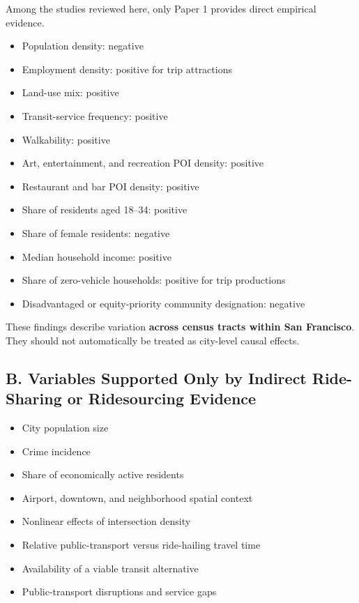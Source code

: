 \documentclass[10pt,a4paper]{article}
\providecommand{\tightlist}{\setlength{\itemsep}{0pt}\setlength{\parskip}{0pt}}
\begin{document}
Among the studies reviewed here, only Paper 1 provides direct empirical evidence.

\begin{itemize}
\tightlist
\item
  Population density: negative
\item
  Employment density: positive for trip attractions
\item
  Land-use mix: positive
\item
  Transit-service frequency: positive
\item
  Walkability: positive
\item
  Art, entertainment, and recreation POI density: positive
\item
  Restaurant and bar POI density: positive
\item
  Share of residents aged 18--34: positive
\item
  Share of female residents: negative
\item
  Median household income: positive
\item
  Share of zero-vehicle households: positive for trip productions
\item
  Disadvantaged or equity-priority community designation: negative
\end{itemize}

These findings describe variation \textbf{across census tracts within San Francisco}. They should not automatically be treated as city-level causal effects.

\hypertarget{b.-variables-supported-only-by-indirect-ride-sharing-or-ridesourcing-evidence}{%
\subsection{B. Variables Supported Only by Indirect Ride-Sharing or Ridesourcing Evidence}\label{b.-variables-supported-only-by-indirect-ride-sharing-or-ridesourcing-evidence}}

\begin{itemize}
\tightlist
\item
  City population size
\item
  Crime incidence
\item
  Share of economically active residents
\item
  Airport, downtown, and neighborhood spatial context
\item
  Nonlinear effects of intersection density
\item
  Relative public-transport versus ride-hailing travel time
\item
  Availability of a viable transit alternative
\item
  Public-transport disruptions and service gaps
\end{itemize}
\end{document}
